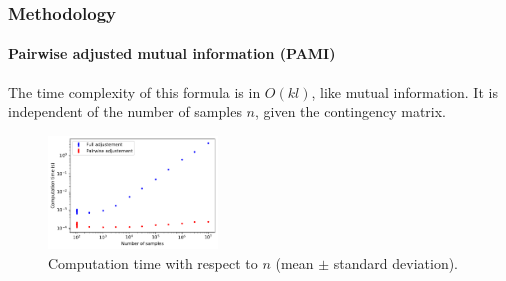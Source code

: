 \documentclass{tum-presentation}
\begin{document}
\begin{frame} 
	\frametitle{Methodology}
	\framesubtitle{Pairwise adjusted mutual information (PAMI)}
	
	The time complexity of this formula is  in $O(kl)$, like mutual information. It is independent of the number of samples $n$, given the contingency matrix.
	
	\begin{figure}[h]
		\centering
		\includegraphics[width=0.4\textwidth,keepaspectratio=true]{../figures/computation_synthetic.pdf}
		\caption{Computation time with respect to    $n$ (mean $\pm$ standard deviation).\label{fig:time}}
	\end{figure}
	
\end{frame}

%		
%		
\end{document}
